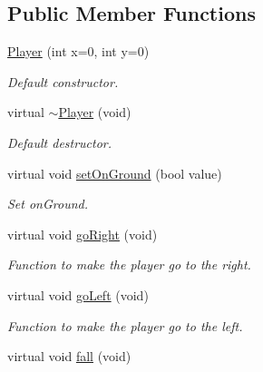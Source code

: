 \subsection*{Public Member Functions}
\begin{DoxyCompactItemize}
\item 
\hyperlink{class_player_a8e899b26bfec32ea70b2fbd983fa1ecc}{Player} (int x=0, int y=0)
\begin{DoxyCompactList}\small\item\em Default constructor. \end{DoxyCompactList}\item 
\hypertarget{class_player_a949762ad57300f070d83ec877ec6e907}{virtual \hyperlink{class_player_a949762ad57300f070d83ec877ec6e907}{$\sim$\-Player} (void)}\label{class_player_a949762ad57300f070d83ec877ec6e907}

\begin{DoxyCompactList}\small\item\em Default destructor. \end{DoxyCompactList}\item 
virtual void \hyperlink{class_player_aae6b7a837033bdd2338a200963f4309a}{set\-On\-Ground} (bool value)
\begin{DoxyCompactList}\small\item\em Set on\-Ground. \end{DoxyCompactList}\item 
\hypertarget{class_player_ade1f198046c99aa0a9a7b84b25e43621}{virtual void \hyperlink{class_player_ade1f198046c99aa0a9a7b84b25e43621}{go\-Right} (void)}\label{class_player_ade1f198046c99aa0a9a7b84b25e43621}

\begin{DoxyCompactList}\small\item\em Function to make the player go to the right. \end{DoxyCompactList}\item 
\hypertarget{class_player_ad5ec9b977afe277362f917883d18c2d2}{virtual void \hyperlink{class_player_ad5ec9b977afe277362f917883d18c2d2}{go\-Left} (void)}\label{class_player_ad5ec9b977afe277362f917883d18c2d2}

\begin{DoxyCompactList}\small\item\em Function to make the player go to the left. \end{DoxyCompactList}\item 
\hypertarget{class_player_a21d91a2eb70e1e4f9d8a60c11dcdd523}{virtual void \hyperlink{class_player_a21d91a2eb70e1e4f9d8a60c11dcdd523}{fall} (void)}\label{class_player_a21d91a2eb70e1e4f9d8a60c11dcdd523}


\end{DoxyCompactItemize}
